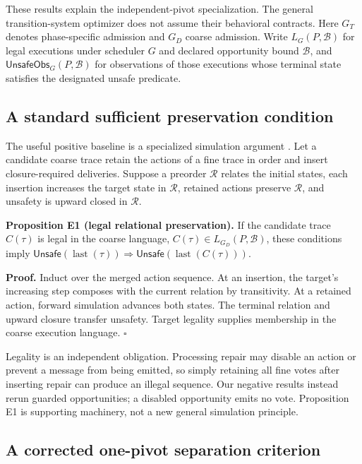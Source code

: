 \label{app:frontier}

These results explain the independent-pivot specialization. The general
transition-system optimizer does not assume their behavioral contracts.
Here \(G_T\) denotes phase-specific admission and \(G_D\) coarse
admission. Write \(L_G(P,\mathcal B)\) for legal executions under
scheduler \(G\) and declared opportunity bound \(\mathcal B\), and
\(\mathsf{UnsafeObs}_G(P,\mathcal B)\) for observations of those
executions whose terminal state satisfies the designated unsafe
predicate.

\subsection{A standard sufficient preservation
condition}\label{a-standard-sufficient-preservation-condition}

The useful positive baseline is a specialized simulation argument
\cite{lynch1995simulations}. Let a candidate coarse trace retain the
actions of a fine trace in order and insert closure-required deliveries.
Suppose a preorder \(\mathcal R\) relates the initial states, each
insertion increases the target state in \(\mathcal R\), retained actions
preserve \(\mathcal R\), and unsafety is upward closed in
\(\mathcal R\).

\textbf{Proposition E1 (legal relational preservation).} If the
candidate trace \(C(\tau)\) is legal in the coarse language,
\(C(\tau)\in L_{G_D}(P,\mathcal B)\), these conditions imply
\(\mathsf{Unsafe}(\operatorname{last}(\tau))\Rightarrow
\mathsf{Unsafe}(\operatorname{last}(C(\tau)))\).

\textbf{Proof.} Induct over the merged action sequence. At an insertion,
the target's increasing step composes with the current relation by
transitivity. At a retained action, forward simulation advances both
states. The terminal relation and upward closure transfer unsafety.
Target legality supplies membership in the coarse execution language.
\(\square\)

Legality is an independent obligation. Processing repair may disable an
action or prevent a message from being emitted, so simply retaining all
fine votes after inserting repair can produce an illegal sequence. Our
negative results instead rerun guarded opportunities; a disabled
opportunity emits no vote. Proposition E1 is supporting machinery, not a
new general simulation principle.

\subsection{A corrected one-pivot separation
criterion}\label{a-corrected-one-pivot-separation-criterion}

